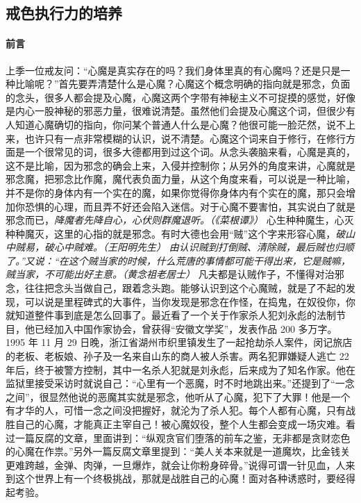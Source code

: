 \subsection{戒色执行力的培养}

\paragraph*{前言}

上季一位戒友问：“心魔是真实存在的吗？我们身体里真的有心魔吗？还是只是一种比喻呢？”首先要弄清楚什么是心魔？心魔这个概念明确的指向就是邪念，负面的念头，很多人都会提及心魔，心魔这两个字带有神秘主义不可捉摸的感觉，好像是内心一股神秘的邪恶力量，很难说清楚。虽然他们会提及心魔这个词，但很少有人知道心魔确切的指向，你问某个普通人什么是心魔？他很可能一脸茫然，说不上来，也许只有一点非常模糊的认识，说不清楚。心魔这个词来自于修行，在修行方面是一个很常见的词，很多大德都用到过这个词。从念头袭脑来看，心魔是真的，这不是比喻，因为邪念的确会上来，入侵并控制你；从另外的角度来讲，心魔就是邪念魔，把邪念比作魔，魔代表负面力量，从这个角度来看，可以说是一种比喻，并不是你的身体内有一个实在的魔，如果你觉得你身体内有个实在的魔，那只会增加你恐惧的心理，而且弄不好还会陷入迷信。对于心魔不要害怕，其实说白了就是邪念而已，\textit{降魔者先降自心，心伏则群魔退听。（《菜根谭》）} 心生种种魔生，心灭种种魔灭，这里的心指的就是邪念。有时大德也会用“贼”这个字来形容心魔，\textit{破山中贼易，破心中贼难。（王阳明先生）} \textit{由认识贼到打倒贼、清除贼，最后贼也归顺了。”又说：“在这个贼当家的时候，什么荒唐的事情都可能干得出来，它是贼嘛，贼当家，不可能出好主意。（黄念祖老居士）} 凡夫都是认贼作子，不懂得对治邪念，往往把念头当做自己，跟着念头跑。能够认识到这个心魔贼，就是了不起的发现，可以说是里程碑式的大事件，当你发现是邪念在作怪，在捣鬼，在奴役你，你就知道整件事到底是怎么回事了。最近看了一个关于作家杀人犯刘永彪的法制节目，他已经加入中国作家协会，曾获得“安徽文学奖”，发表作品 200 多万字。1995 年 11 月 29 日晚，浙江省湖州市织里镇发生了一起抢劫杀人案件，闵记旅店的老板、老板娘、孙子及一名来自山东的商人被人杀害。两名犯罪嫌疑人逃亡 22 年后，终于被警方控制，其中一名杀人犯就是刘永彪，后来成为了知名作家。他在监狱里接受采访时就说自己：“心里有一个恶魔，时不时地跳出来。”还提到了“一念之间”，很显然他说的恶魔其实就是邪念，他听从了心魔，犯下了大罪！他是一个有才华的人，可惜一念之间没把握好，就沦为了杀人犯。每个人都有心魔，只有战胜自己的心魔，才能真正主宰自己！被心魔奴役，整个人生都会变成一场灾难。看过一篇反腐的文章，里面讲到：“纵观贪官们堕落的前车之鉴，无非都是贪财恋色的心魔在作祟。”另外一篇反腐文章里提到：“美人关本来就是一道魔坎，比金钱关更难跨越，金弹、肉弹，一旦爆炸，就会让你粉身碎骨。”说得可谓一针见血，人来到这个世界上有一个终极挑战，那就是战胜自己的心魔！面对各种诱惑时，要经得起考验。

